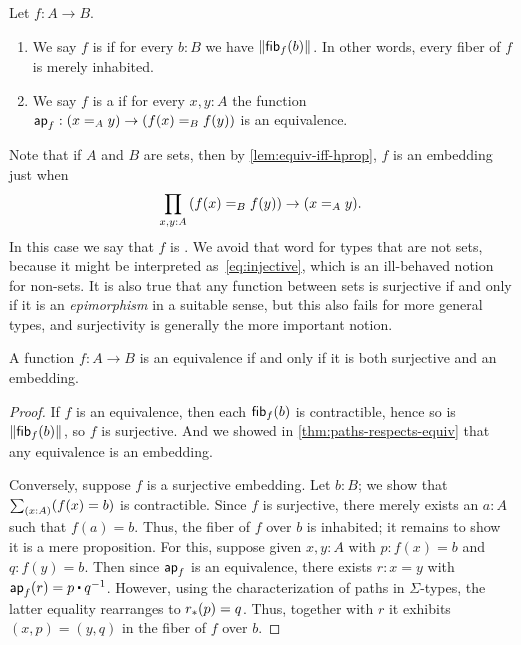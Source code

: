\begin{defn}
  Let $f:A\to B$.
  \begin{enumerate}
  \item We say $f$ is  if for every $b:B$ we have $\brck{\hfib f b}$.
    In other words, every fiber of $f$ is merely inhabited.
  \item We say $f$ is a  if for every $x,y:A$ the function $\apfunc f : (\id[A]xy) \to (\id[B]{f(x)}{f(y)})$ is an equivalence.
  \end{enumerate}
\end{defn}

Note that if $A$ and $B$ are sets, then by \autoref{lem:equiv-iff-hprop}, $f$ is an embedding just when
\begin{equation}
  \prd{x,y:A} (\id[B]{f(x)}{f(y)}) \to (\id[A]xy).\label{eq:injective}
\end{equation}
In this case we say that $f$ is .
We avoid that word for types that are not sets, because it might be interpreted as~\eqref{eq:injective}, which is an ill-behaved notion for non-sets.
It is also true that any function between sets is surjective if and only if it is an \emph{epimorphism} in a suitable sense, but this also fails for more general types, and surjectivity is generally the more important notion.

\begin{thm}\label{thm:mono-surj-equiv}
  A function $f:A\to B$ is an equivalence if and only if it is both surjective and an embedding.
\end{thm}
\begin{proof}
  If $f$ is an equivalence, then each $\hfib f b$ is contractible, hence so is $\brck{\hfib f b}$, so $f$ is surjective.
  And we showed in \autoref{thm:paths-respects-equiv} that any equivalence is an embedding.

  Conversely, suppose $f$ is a surjective embedding.
  Let $b:B$; we show that $\sm{x:A}(f(x)=b)$ is contractible.
  Since $f$ is surjective, there merely exists an $a:A$ such that $f(a)=b$.
  Thus, the fiber of $f$ over $b$ is inhabited; it remains to show it is a mere proposition.
  For this, suppose given $x,y:A$ with $p:f(x)=b$ and $q:f(y)=b$.
  Then since $\apfunc f$ is an equivalence, there exists $r:x=y$ with $\apfunc f (r) = p \ct \opp q$.
  However, using the characterization of paths in $\Sigma$-types, the latter equality rearranges to $\trans{r}{p} = q$.
  Thus, together with $r$ it exhibits $(x,p) = (y,q)$ in the fiber of $f$ over $b$.
\end{proof}

